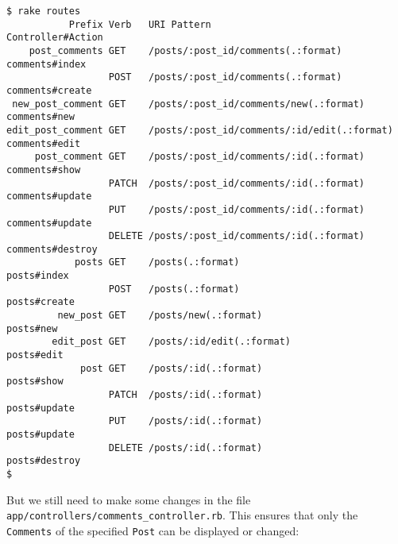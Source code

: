 \documentclass[a4paper]{book}
\begin{document}
\begin{shaded}\begin{verbatim}
$ rake routes
           Prefix Verb   URI Pattern                                 Controller#Action
    post_comments GET    /posts/:post_id/comments(.:format)          comments#index
                  POST   /posts/:post_id/comments(.:format)          comments#create
 new_post_comment GET    /posts/:post_id/comments/new(.:format)      comments#new
edit_post_comment GET    /posts/:post_id/comments/:id/edit(.:format) comments#edit
     post_comment GET    /posts/:post_id/comments/:id(.:format)      comments#show
                  PATCH  /posts/:post_id/comments/:id(.:format)      comments#update
                  PUT    /posts/:post_id/comments/:id(.:format)      comments#update
                  DELETE /posts/:post_id/comments/:id(.:format)      comments#destroy
            posts GET    /posts(.:format)                            posts#index
                  POST   /posts(.:format)                            posts#create
         new_post GET    /posts/new(.:format)                        posts#new
        edit_post GET    /posts/:id/edit(.:format)                   posts#edit
             post GET    /posts/:id(.:format)                        posts#show
                  PATCH  /posts/:id(.:format)                        posts#update
                  PUT    /posts/:id(.:format)                        posts#update
                  DELETE /posts/:id(.:format)                        posts#destroy
$
\end{verbatim}\end{shaded}

But we still need to make some changes in the file \texttt{app/controllers/comments\_controller.rb}. This ensures that only the \texttt{Comments} of the specified \texttt{Post} can be displayed or changed:
\end{document}
